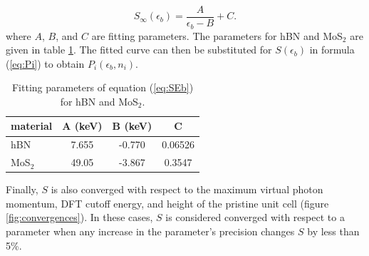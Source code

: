 \documentclass{article}
\begin{document}
\begin{equation}
  S_\infty(\epsilon_b)
  =
  \frac{A}{\epsilon_b - B} + C.
  \label{eq:SEb}
\end{equation}
%
where $A$, $B$, and $C$ are fitting parameters.
The parameters for hBN and MoS$_2$ are given in table \ref{tab:fit}.
The fitted curve can then be substituted for $S(\epsilon_b)$ in formula
(\ref{eq:Pi}) to obtain $P_i(\epsilon_b, n_i)$.

\begin{table} \centering 
  \begin{tabular}{lccc}
    \toprule
    material &A (keV) &B (keV) &C \\
    \midrule
    hBN     &7.655 &-0.770 &0.06526 \\
    MoS$_2$ &49.05 &-3.867 &0.3547 \\
    \bottomrule
  \end{tabular}
  \caption{
    Fitting parameters of equation (\ref{eq:SEb}) for hBN and MoS$_2$.
  } 
\label{tab:fit}
\end{table}

Finally, $S$ is also converged with respect to the maximum virtual photon
momentum, DFT cutoff energy, and height of the pristine unit cell (figure
\ref{fig:convergences}).
In these cases, $S$ is considered converged with respect to a parameter
when any increase in the parameter's precision changes $S$ by less than 5\%.
\end{document}
